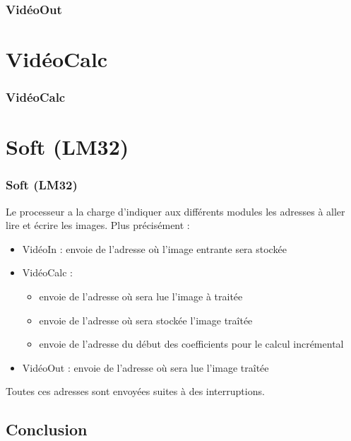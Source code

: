\documentclass[a4paper,12pt]{report}
\begin{document}
{}

\newpage
 
    \section*{VidéoOut}

{}
     








    \part{VidéoCalc} 
    \section*{VidéoCalc}

{}










    \part{Soft (LM32)} 

    \section*{Soft (LM32)}

{Le processeur a la charge d'indiquer aux différents modules les adresses à aller lire et écrire les images. Plus précisément :

\begin{itemize}
	\item VidéoIn : envoie de l'adresse où l'image entrante sera stockée
	\item VidéoCalc : \begin{itemize}
								\item envoie de l'adresse où sera lue l'image à traitée
								\item envoie de l'adresse où sera stockée l'image traîtée
								\item envoie de l'adresse du début des coefficients pour le calcul incrémental
							\end{itemize}
	\item VidéoOut : envoie de l'adresse où sera lue l'image traîtée
\end{itemize}

Toutes ces adresses sont envoyées suites à des interruptions.
}



 
    \chapter*{Conclusion}
{}


\end{document}
